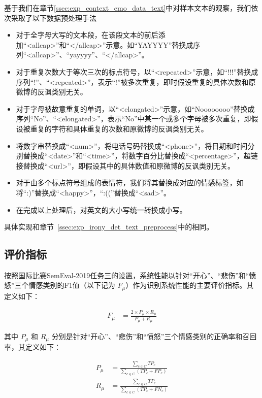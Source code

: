 基于我们在章节\ref{ssec:exp_context_emo_data_text}中对样本文本的观察，我们依次采取了以下数据预处理手法

\begin{itemize}

\item 对于全字母大写的文本段，在该段文本的前后添加“<allcap>”和“</allcap>”示意。如“YAYYYY”替换成序列“<allcap>”、“yayyyy”、“</allcap>”。

\item 对于重复次数大于等次三次的标点符号，以“<repeated>”示意，如“!!!”替换成序列“!”、“<repeated>”，表示“!”被多次重复，即时假设重复的具体次数和原微博的反讽类别无关。

\item 对于字母被故意重复的单词，以“<elongated>”示意，如“Noooooooo”替换成序列“No”、“<elongated>”，表示“No”中某一个或多个字母被多次重复，即假设被重复的字符和具体重复的次数和原微博的反讽类别无关。

\item 将数字串替换成“<num>”，将电话号码替换成“<phone>”，将日期和时间分别替换成“<date>”和“<time>”，将数字百分比替换成“<percentage>”，超链接替换成“<url>”，即假设其中的具体数值和原微博的反讽类别无关。

\item 对于由多个标点符号组成的表情符，我们将其替换成对应的情感标签，如将“:)”替换成“<happy>”，“:((”替换成“<sad>”。

\item 在完成以上处理后，对英文的大小写统一转换成小写。

\end{itemize}

具体实现和章节~\ref{ssec:exp_irony_det_text_preprocess}中的相同。

\subsection{评价指标}
\label{ssec:exp_context_emo_eval_metric}

按照国际比赛SemEval-2019任务三的设置，系统性能以针对“开心”、“悲伤”和“愤怒”三个情感类别的F1值（以下记为 $F_\mu$）作为识别系统性能的主要评价指标。其定义如下：

\begin{align}
  F_\mu &= \frac{2 \times P_\mu \times R_\mu}{P_\mu + R_\mu}
\end{align}

其中 $P_\mu$ 和 $R_\mu$ 分别是针对“开心”、“悲伤”和“愤怒”三个情感类别的正确率和召回率，其定义如下：

\begin{align}
  P_\mu &= \frac{\sum\limits_{c \in C} TP_c}{\sum\limits_{c \in C}(TP_c + FP_c)} \\
  R_\mu &= \frac{\sum\limits_{c \in C} TP_c}{\sum\limits_{c \in C}(TP_c + FN_c)}
\end{align}

